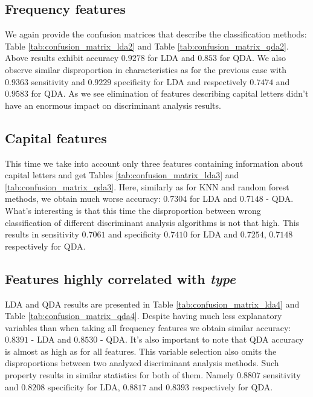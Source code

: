 \documentclass{article}\usepackage[]{graphicx}\usepackage[]{xcolor}
\begin{document}
\subsection*{Frequency features}

We again provide the confusion matrices that describe the classification methods: 
Table \ref{tab:confusion_matrix_lda2} and Table \ref{tab:confusion_matrix_qda2}.
Above results exhibit accuracy $0.9278$ for LDA and $0.853$ for QDA. We also 
observe similar disproportion in characteristics as for the previous case with 
$0.9363$ sensitivity and $0.9229$ specificity for LDA and respectively $0.7474$ 
and $0.9583$ for QDA. As we see elimination of features describing capital letters 
didn't have an enormous impact on discriminant analysis results.

\subsection*{Capital features}

This time we take into account only three features containing information about capital 
letters and get Tables \ref{tab:confusion_matrix_lda3} and \ref{tab:confusion_matrix_qda3}.
Here, similarly as for KNN and random forest methods, we obtain much worse accuracy: $0.7304$ for LDA and $0.7148$ - QDA. What's 
interesting is that this time the disproportion between wrong classification of 
different discriminant analysis algorithms is not that high. This results in sensitivity 
$0.7061$ and specificity $0.7410$ for LDA and $0.7254$, $0.7148$ respectively for QDA.

\subsection*{Features highly correlated with \textit{type}}
	 
LDA and QDA results are presented in Table \ref{tab:confusion_matrix_lda4} 
and Table \ref{tab:confusion_matrix_qda4}.
Despite having much less explanatory variables than when taking all frequency 
features we obtain similar accuracy: $0.8391$ - LDA and $0.8530$ - QDA. It's also 
important to note that QDA accuracy is almost as high as for all features. 
This variable selection also omits the disproportions 
between two analyzed discriminant analysis methods. Such property results in similar 
statistics for both of them. Namely $0.8807$ sensitivity and $0.8208$ specificity 
for LDA, $0.8817$ and $0.8393$ respectively for QDA.
	 
\end{document}
